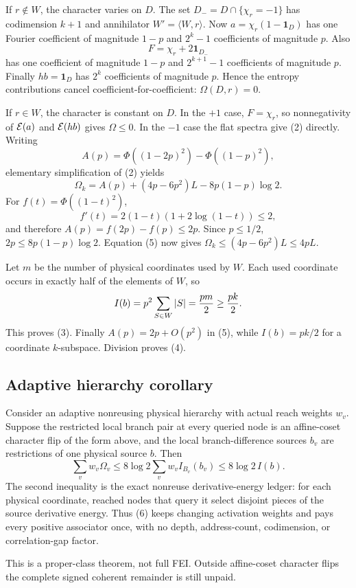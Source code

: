 If $r\notin W$, the character varies on $D$.  The set
$D_-=D\cap\{\chi_r=-1\}$ has codimension $k+1$ and annihilator
$W'=\langle W,r\rangle$.  Now $a=\chi_r(1-\mathbf1_D)$ has one Fourier
coefficient of magnitude $1-p$ and $2^k-1$ coefficients of magnitude $p$.
Also
\[
 F=\chi_r+2\mathbf1_{D_-}
\]
has one coefficient of magnitude $1-p$ and $2^{k+1}-1$ coefficients of
magnitude $p$.  Finally $hb=\mathbf1_D$ has $2^k$ coefficients of magnitude
$p$.  Hence the entropy contributions cancel coefficient-for-coefficient:
$\Omega(D,r)=0$.

If $r\in W$, the character is constant on $D$.  In the $+1$ case,
$F=\chi_r$, so nonnegativity of ${\cal E}(a)$ and ${\cal E}(hb)$ gives
$\Omega\leq0$.  In the $-1$ case the flat spectra give (2) directly.
Writing
\[
 A(p)=\Phi((1-2p)^2)-\Phi((1-p)^2),
\]
elementary simplification of (2) yields
\[
 \Omega_k=A(p)+(4p-6p^2)L-8p(1-p)\log2.                     \tag{5}
\]
For $f(t)=\Phi((1-t)^2)$,
\[
 f'(t)=2(1-t)(1+2\log(1-t))\leq2,
\]
and therefore $A(p)=f(2p)-f(p)\leq2p$.  Since $p\leq1/2$,
$2p\leq8p(1-p)\log2$.  Equation (5) now gives
$\Omega_k\leq(4p-6p^2)L\leq4pL$.

Let $m$ be the number of physical coordinates used by $W$.  Each used
coordinate occurs in exactly half of the elements of $W$, so
\[
 I(b)=p^2\sum_{S\in W}|S|={pm\over2}\geq{pk\over2}.
\]
This proves (3).  Finally $A(p)=2p+O(p^2)$ in (5), while
$I(b)=pk/2$ for a coordinate $k$-subspace.  Division proves (4).

\subsection*{Adaptive hierarchy corollary}
Consider an adaptive nonreusing physical hierarchy with actual reach weights
$w_v$.  Suppose the restricted local branch pair at every queried node is an
affine-coset character flip of the form above, and the local branch-difference
sources $b_v$ are restrictions of one physical source $b$.  Then
\[
 \sum_v w_v\Omega_v
 \leq 8\log2\sum_v w_v I_{B_v}(b_v)
 \leq 8\log2\,I(b).                                         \tag{6}
\]
The second inequality is the exact nonreuse derivative-energy ledger: for
each physical coordinate, reached nodes that query it select disjoint pieces
of the source derivative energy.  Thus (6) keeps changing activation weights
and pays every positive associator once, with no depth, address-count,
codimension, or correlation-gap factor.

This is a proper-class theorem, not full FEI.  Outside affine-coset character
flips the complete signed coherent remainder is still unpaid.

